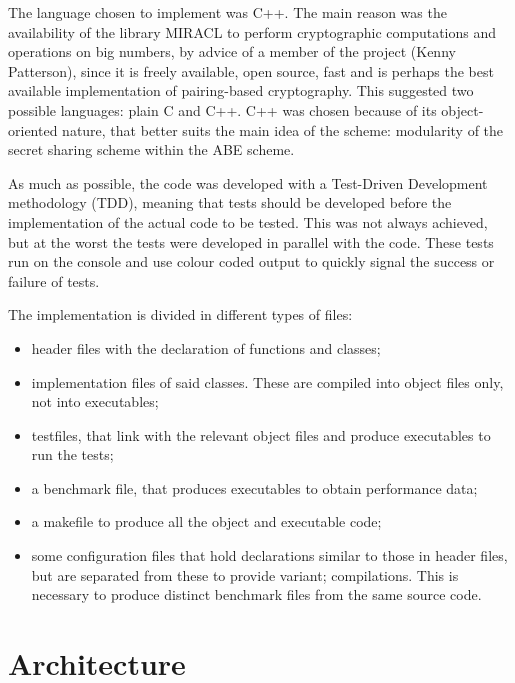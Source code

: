 \documentclass{article}
\begin{document}
The language chosen to implement was C++. The main reason was the availability of the library MIRACL to perform cryptographic computations and operations on big numbers, by advice of a member of the project (Kenny Patterson), since it is freely available, open source, fast and is perhaps the best available implementation of pairing-based cryptography. This suggested two possible languages: plain C and C++. C++ was chosen because of its object-oriented nature, that better suits the main idea of the scheme: modularity of the secret sharing scheme within the ABE scheme.

As much as possible, the code was developed with a Test-Driven Development methodology (TDD), meaning that tests should be developed before the implementation of the actual code to  be tested. This was not always achieved, but at the worst the tests were developed in parallel with the code.
These tests run on the console and use colour coded output to quickly signal the success or failure of tests.

The implementation is divided in different types of files:
\begin{itemize}
\item header files with the declaration of functions and classes;
\item implementation files of said classes. These are compiled into object files only, not into executables;
\item testfiles, that link with the relevant object files and produce executables to run the tests;
\item a benchmark file, that produces executables to obtain performance data;
\item a makefile to produce all the object and executable code;
\item some configuration files that hold declarations similar to those in header files, but are separated from these to provide variant; compilations. This is necessary to produce distinct benchmark files from the same source code.
\end{itemize}



\section{Architecture}
\end{document}
